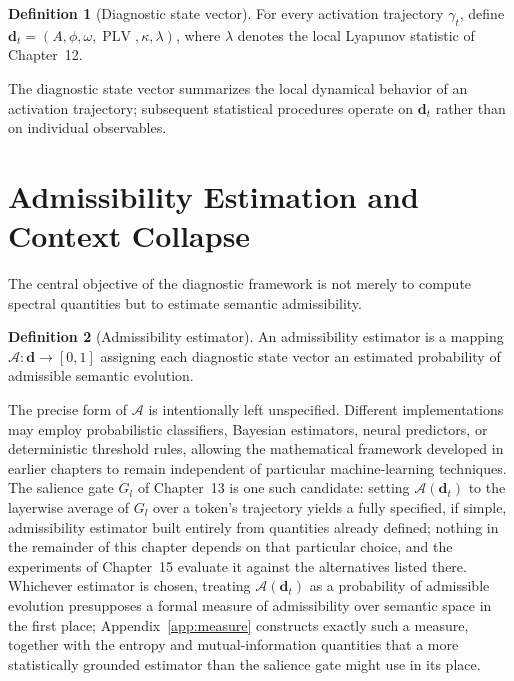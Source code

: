 \documentclass[11pt,twoside,openright]{book}
\numberwithin{equation}{chapter}
\theoremstyle{definition}
\newtheorem{definition}{Definition}[chapter]
\theoremstyle{plain}
\theoremstyle{remark}
\theoremstyle{definition}
\begin{document}
\begin{definition}[Diagnostic state vector]
For every activation trajectory $\gamma_t$, define
$\mathbf{d}_t=(A,\phi,\omega,\operatorname{PLV},\kappa,\lambda)$, where
$\lambda$ denotes the local Lyapunov statistic of Chapter~12.
\end{definition}

The diagnostic state vector summarizes the local dynamical behavior of an
activation trajectory; subsequent statistical procedures operate on
$\mathbf{d}_t$ rather than on individual observables.

\section{Admissibility Estimation and Context Collapse}

The central objective of the diagnostic framework is not merely to
compute spectral quantities but to estimate semantic admissibility.

\begin{definition}[Admissibility estimator]
An admissibility estimator is a mapping $\mathcal{A}:\mathbf{d}\to[0,1]$
assigning each diagnostic state vector an estimated probability of
admissible semantic evolution.
\end{definition}

The precise form of $\mathcal{A}$ is intentionally left unspecified.
Different implementations may employ probabilistic classifiers, Bayesian
estimators, neural predictors, or deterministic threshold rules, allowing
the mathematical framework developed in earlier chapters to remain
independent of particular machine-learning techniques. The salience gate
$G_l$ of Chapter~13 is one such candidate: setting
$\mathcal{A}(\mathbf{d}_t)$ to the layerwise average of $G_l$ over a
token's trajectory yields a fully specified, if simple, admissibility
estimator built entirely from quantities already defined; nothing in the
remainder of this chapter depends on that particular choice, and the
experiments of Chapter~15 evaluate it against the alternatives listed
there. Whichever estimator is chosen, treating $\mathcal{A}(\mathbf{d}_t)$
as a probability of admissible evolution presupposes a formal measure of
admissibility over semantic space in the first place;
Appendix~\ref{app:measure} constructs exactly such a measure, together
with the entropy and mutual-information quantities that a more
statistically grounded estimator than the salience gate might use in
its place.
\end{document}
